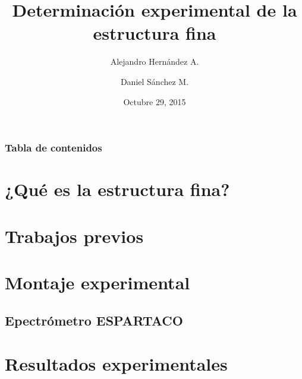 \documentclass{beamer}
\title[Estructura fina]{Determinación experimental de la estructura fina} %
\author[Hernández A., Sánchez D.]{Alejandro Hernández A. \and Daniel Sánchez M.} %
\institute[Uniandes] %
{
Universidad de los Andes, Bogotá, Colombia \\ %
}
\date{Octubre 29, 2015} %
\begin{document}
\begin{frame}
\titlepage %
\end{frame}

\begin{frame}
\frametitle{Tabla de contenidos} %
\tableofcontents %
\end{frame}


\section{¿Qué es la estructura fina?} %

\section{Trabajos previos}


\section{Montaje experimental}

\subsection{Epectrómetro ESPARTACO}

\section{Resultados experimentales}
\end{document}
